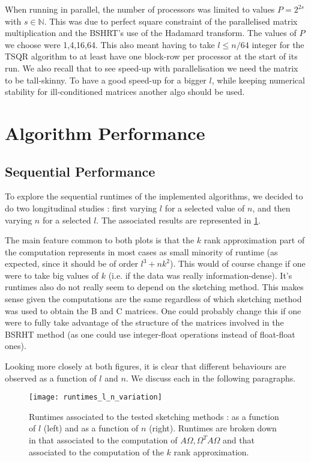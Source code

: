 \documentclass[a4paper, 12pt,oneside]{article}
\begin{document}
		When running in parallel, the number of processors was limited to values $P=2^{2s}$ with $s\in\mathbb{N}$. This was due to perfect square constraint of the parallelised matrix multiplication and the BSHRT's use of the Hadamard transform. The values of $P$ we choose were 1,4,16,64. 		
		This also meant having to take $l\le n/64$ integer for the TSQR algorithm to at least have one block-row per processor at the start of its run. We also recall that to see speed-up with parallelisation we need the matrix to be tall-skinny. To have a good speed-up for a bigger $l$, while keeping numerical stability for ill-conditioned matrices another algo should be used.
	
	
		\section{Algorithm Performance}
        \subsection{Sequential Performance}
		To explore the sequential runtimes of the implemented algorithms, we decided to do two longitudinal studies : first varying $l$ for a selected value of $n$, and then varying $n$ for a selected $l$. The associated results are represented in \ref{fig:runtimes-l-n-variation}. 

		The main feature common to both plots is that the $k$ rank approximation part of the computation represents in most cases as small minority of runtime (as expected, since it should be of order $l^3 +nk^2$). This would of course change if one were to take big values of $k$ (i.e. if the data was really information-dense).  	
		It's runtimes also do not really seem to depend on the sketching method. This makes sense given the computations are the same regardless of which sketching method was used to obtain the B and C matrices. One could probably change this if one were to fully take advantage of the structure of the matrices involved in the BSRHT method (as one could use integer-float operations instead of float-float ones). 

		Looking more closely at both figures, it is clear that different behaviours are observed as a function of $l$ and $n$. We discuss each in the following paragraphs.
		\begin{figure}[htb]       
			\centering             
				\vspace{0em}
				\texttt{[image: runtimes\_l\_n\_variation]}
				\caption{Runtimes associated to the tested sketching methods : as a function of $l$ (left) and as a function of $n$ (right). Runtimes are broken down in that associated to the computation of $A\Omega,\Omega^T A\Omega$ and that associated to the computation of the $k$ rank approximation.}
				\label{fig:runtimes-l-n-variation}
		\end{figure}
\end{document}

